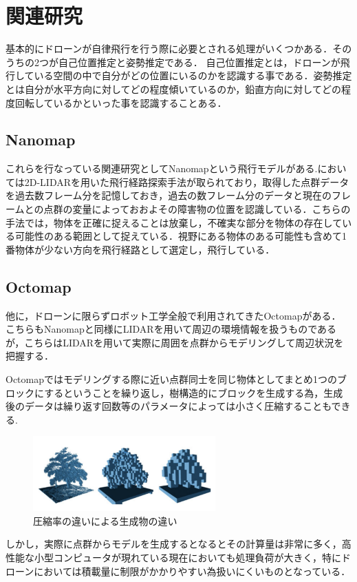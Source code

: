 \chapter{関連研究}
\label{related_works}

基本的にドローンが自律飛行を行う際に必要とされる処理がいくつかある．そのうちの2つが自己位置推定と姿勢推定である．
自己位置推定とは，ドローンが飛行している空間の中で自分がどの位置にいるのかを認識する事である．姿勢推定とは自分が水平方向に対してどの程度傾いているのか，鉛直方向に対してどの程度回転しているかといった事を認識することある．

\section{Nanomap}
これらを行なっている関連研究としてNanomap\cite{Nanomap}という飛行モデルがある.においては2D-LIDARを用いた飛行経路探索手法が取られており，取得した点群データを過去数フレーム分を記憶しておき，過去の数フレーム分のデータと現在のフレームとの点群の変量によっておおよその障害物の位置を認識している．こちらの手法では，物体を正確に捉えることは放棄し，不確実な部分を物体の存在している可能性のある範囲として捉えている．視野にある物体のある可能性も含めて1番物体が少ない方向を飛行経路として選定し，飛行している．

\section{Octomap}
他に，ドローンに限らずロボット工学全般で利用されてきたOctomap\cite{Octomap}がある．
こちらもNanomapと同様にLIDARを用いて周辺の環境情報を扱うものであるが，こちらはLIDARを用いて実際に周囲を点群からモデリングして周辺状況を把握する．

Octomapではモデリングする際に近い点群同士を同じ物体としてまとめ1つのブロックにするということを繰り返し，樹構造的にブロックを生成する為，生成後のデータは繰り返す回数等のパラメータによっては小さく圧縮することもできる.
\begin{figure}[htbp]
  \begin{center}
    \includegraphics[clip,width=7.0cm]{img/octomap.png}
    \caption{圧縮率の違いによる生成物の違い}
    \label{fig:hamu}
  \end{center}
\end{figure}
しかし，実際に点群からモデルを生成するとなるとその計算量は非常に多く，高性能な小型コンピュータが現れている現在においても処理負荷が大きく，特にドローンにおいては積載量に制限がかかりやすい為扱いにくいものとなっている．


